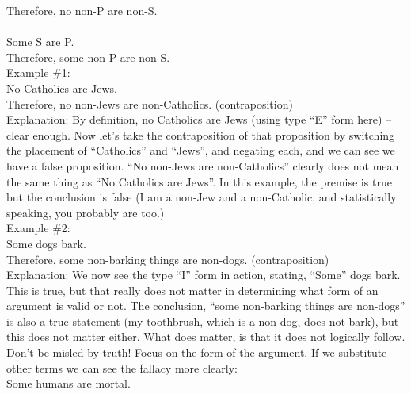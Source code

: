 \documentclass[a4paper,12pt,single,pdftex]{scrartcl}
\begin{document}
    
      Therefore, no non-P are non-S.
    \\

    
       
    \\

    
      Some S are P.
    \\

    
      Therefore, some non-P are non-S.
    \\

    
      Example \#1:
    \\

    
      No Catholics are Jews.
    \\

    
      Therefore, no non-Jews are non-Catholics. (contraposition)
    \\

    
      Explanation: By definition, no Catholics are Jews (using type “E” form here) -- clear enough.  Now let’s take the contraposition of that proposition by switching the placement of “Catholics” and “Jews”, and negating each, and we can see we have a false proposition.  “No non-Jews are non-Catholics” clearly does not mean the same thing as “No Catholics are Jews”.  In this example, the premise is true but the conclusion is false (I am a non-Jew and a non-Catholic, and statistically speaking, you probably are too.)
    \\

    
      Example \#2:
    \\

    
      Some dogs bark.
    \\

    
      Therefore, some non-barking things are non-dogs. (contraposition)
    \\

    
      Explanation: We now see the type “I” form in action, stating, “Some” dogs bark.  This is true, but that really does not matter in determining what form of an argument is valid or not.  The conclusion, “some non-barking things are non-dogs” is also a true statement (my toothbrush, which is a non-dog, does not bark), but this does not matter either.  What does matter, is that it does not logically follow.  Don’t be misled by truth!  Focus on the form of the argument.  If we substitute other terms we can see the fallacy more clearly:
    \\

    
      Some humans are mortal.
    \\
\end{document}
